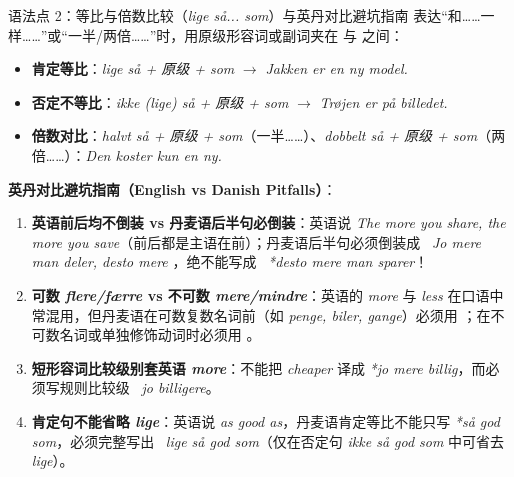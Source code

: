 \begin{grammatikbox}{语法点 2：等比与倍数比较（\textit{lige så... som}）与英丹对比避坑指南}
表达“和……一样……”或“一半/两倍……”时，用原级形容词或副词夹在  与  之间：
\begin{itemize}
  \item \textbf{肯定等比}：\textit{lige så + 原级 + som} $\rightarrow$ \textit{Jakken er  en ny model.}
  \item \textbf{否定不等比}：\textit{ikke (lige) så + 原级 + som} $\rightarrow$ \textit{Trøjen er  på billedet.}
  \item \textbf{倍数对比}：\textit{halvt så + 原级 + som}（一半……）、\textit{dobbelt så + 原级 + som}（两倍……）：\textit{Den koster kun  en ny.}
\end{itemize}

\vspace{0.3em}
\textbf{英丹对比避坑指南（English vs Danish Pitfalls）}：
\begin{enumerate}
  \item \textbf{英语前后均不倒装 vs 丹麦语后半句必倒装}：英语说 \textit{The more you share, the more you save}（前后都是主语在前）；丹麦语后半句必须倒装成 \ \textit{Jo mere man deler, desto mere }，绝不能写成 \ \textit{*desto mere man sparer}！
  \item \textbf{可数 \textit{flere/færre} vs 不可数 \textit{mere/mindre}}：英语的 \textit{more} 与 \textit{less} 在口语中常混用，但丹麦语在可数复数名词前（如 \textit{penge, biler, gange}）必须用 ；在不可数名词或单独修饰动词时必须用 。
  \item \textbf{短形容词比较级别套英语 \textit{more}}：不能把 \textit{cheaper} 译成 \textit{*jo mere billig}，而必须写规则比较级 \ \textit{jo billigere}。
  \item \textbf{肯定句不能省略 \textit{lige}}：英语说 \textit{as good as}，丹麦语肯定等比不能只写 \textit{*så god som}，必须完整写出 \ \textit{lige så god som}（仅在否定句 \textit{ikke så god som} 中可省去 \textit{lige}）。
\end{enumerate}
\end{grammatikbox}


